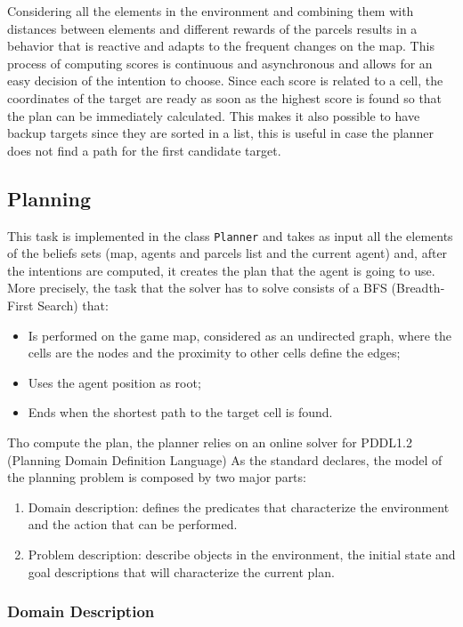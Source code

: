 \documentclass[a4paper, 11pt]{article}
\begin{document}
Considering all the elements in the environment and combining them with distances between elements and different rewards of the parcels results in a behavior that is reactive and adapts to the frequent changes on the map. This process of computing scores is continuous and asynchronous and allows for an easy decision of the intention to choose. Since each score is related to a cell, the coordinates of the target are ready as soon as the highest score is found so that the plan can be immediately calculated. This makes it also possible to have backup targets since they are sorted in a list, this is useful in case the planner does not find a path for the first candidate target.

\subsection{Planning}

This task is implemented in the class \verb|Planner| and takes as input all the elements of the beliefs sets (map, agents and parcels list and the current agent) and, after the intentions are computed, it creates the plan that the agent is going to use.
More precisely, the task that the solver has to solve consists of a BFS (Breadth-First Search) that:
\begin{itemize}
    \item Is performed on the game map, considered as an undirected graph, where the cells are the nodes and the proximity to other cells define the edges;
    \item Uses the agent position as root;
    \item Ends when the shortest path to the target cell is found.
\end{itemize}

Tho compute the plan, the planner relies on an online solver for PDDL1.2 (Planning Domain Definition Language) As the standard declares, the model of the planning problem is composed by two major parts:
\begin{enumerate}
    \item Domain description: defines the predicates that characterize the environment and the action that can be performed.
    \item Problem description: describe objects in the environment, the initial state and goal descriptions that will characterize the current plan.
\end{enumerate}

\subsubsection{Domain Description}
\end{document}
